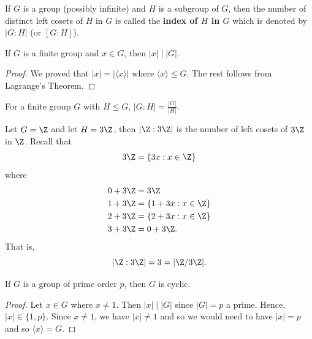 \begin{definition}
    If \( G  \) is a group (possibly infinite) and \( H  \) is a subgroup of \( G  \), then the number of distinct left cosets of \( H  \) in \( G  \) is called the \textbf{index of \( H  \) in \( G  \)} which is denoted by \( | G : H  |  \) (or \( [G : H]   \)). 
\end{definition}

\begin{corollary}
   If \( G  \) is a finite group and \( x \in G  \), then \( | x  |  \mid | G  |  \).
\end{corollary}
\begin{proof}
    We proved that \( | x  |  = | \langle x \rangle  |   \) where \( \langle x \rangle \leq G  \). The rest follows from Lagrange's Theorem. 
\end{proof}

\begin{remark}
    For a finite group \( G  \) with \( H \leq G  \), \( | G : H  |  = \frac{ | G |  }{  | H  |  }  \).
\end{remark}

\begin{eg}
   Let \( G = \Z  \) and let \( H = 3 \Z  \), then \( |  \Z  : 3 \Z  |  \) is the number of left cosets of \( 3 \Z   \) in \( \Z  \). Recall that 
   \[  3 \Z =  \{  3x : x \in \Z  \}  \]
   where 
   \begin{align*}
       0 + 3 \Z &= 3 \Z  \\
       1 + 3 \Z &= \{  1 + 3x : x \in \Z  \}  \\
       2 + 3 \Z &= \{ 2 + 3x : x \in \Z  \}  \\
       3 + 3 \Z &= 0 + 3 \Z. 
   \end{align*}
   That is, 
   \[  | \Z : 3\Z  |  = 3 = | \Z / 3 \Z   |.  \]
\end{eg}

\begin{corollary}
   If \( G  \) is a group of prime order \( p  \), then \( G  \) is cyclic. 
\end{corollary}
\begin{proof}
Let \( x \in G  \) where \( x \neq 1  \). Then \( | x  |  \mid | G  |  \) since \( | G  |  = p  \) a prime. Hence, \( | x  | \in  \{  1, p \}  \). Since \( x \neq 1  \), we have \( | x  |  \neq 1  \) and so we would need to have \( | x  |  = p  \) and so \( \langle x \rangle = G  \).
\end{proof}

